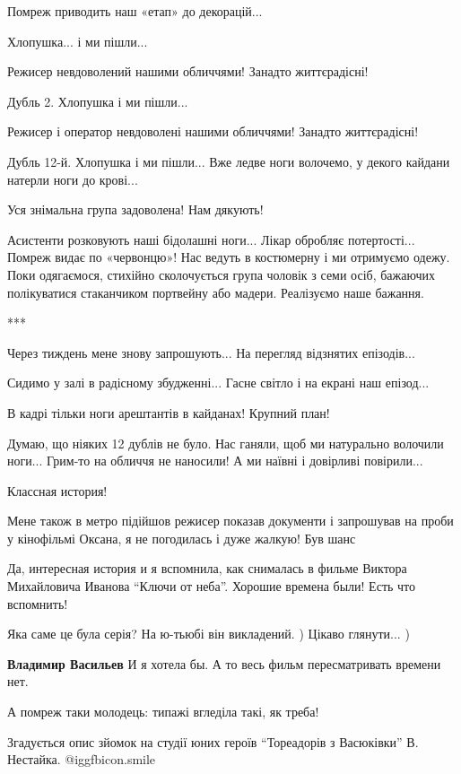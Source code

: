\begin{itemize}
Помреж приводить наш «етап» до декорацій...

Хлопушка... і ми пішли...

Режисер невдоволений нашими обличчями! Занадто життєрадісні!

Дубль 2. Хлопушка і ми пішли...

Режисер і оператор невдоволені нашими обличчями! Занадто життєрадісні!

Дубль 12-й. Хлопушка і ми пішли... Вже ледве ноги волочемо, у декого кайдани
натерли ноги до крові...

Уся знімальна група задоволена! Нам дякують!

Асистенти розковують наші бідолашні ноги... Лікар обробляє потертості... Помреж
видає по «червонцю»! Нас ведуть в костюмерну і ми отримуємо одежу. Поки
одягаємося, стихійно сколочується група чоловік з семи осіб, бажаючих
полікуватися стаканчиком портвейну або мадери. Реалізуємо наше бажання.

***

Через тиждень мене знову запрошують... На перегляд відзнятих епізодів...

Сидимо у залі в радісному збудженні... Гасне світло і на екрані наш епізод...

В кадрі тільки ноги арештантів в кайданах! Крупний план!

Думаю, що ніяких 12 дублів не було. Нас ганяли, щоб ми натурально волочили
ноги... Грим-то на обличчя не наносили! А ми наївні і довірливі повірили...

Классная история!


Мене також в метро підійшов режисер показав документи і запрошував на проби у
кінофільмі Оксана, я не погодилась і дуже жалкую! Був шанс


Да, интересная история и я вспомнила, как снималась в фильме Виктора
Михайловича Иванова \enquote{Ключи от неба}. Хорошие времена были! Есть что вспомнить!

Яка саме це була серія? На ю-тьюбі він викладений. ) Цікаво глянути... )

\textbf{Владимир Васильев} И я хотела бы. А то весь фильм пересматривать времени нет.

А помреж таки молодець: типажі вгледіла такі, як треба!

Згадується опис зйомок на студії юних героїв \enquote{Тореадорів з Васюківки} В. Нестайка.  @igg{fbicon.smile} 


\end{itemize}
